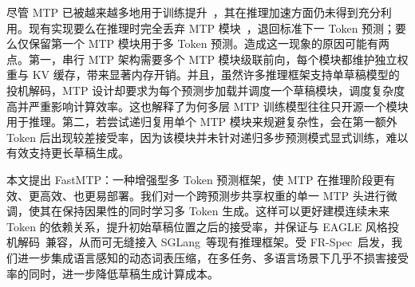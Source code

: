 \documentclass{article} %
\begin{document}



尽管 MTP 已被越来越多地用于训练提升~\citep{qwenteam2025qwen3next80ba3binstruct,glm-4.5team2025glm45,meituanlongcatteam2025longcatflash,xiaomi2025mimo}，其在推理加速方面仍未得到充分利用。现有实现要么在推理时完全丢弃 MTP 模块~\citep{deepseek-ai2024deepseekv3}，退回标准下一 Token 预测；要么仅保留第一个 MTP 模块用于多 Token 预测。造成这一现象的原因可能有两点。第一，串行 MTP 架构需要多个 MTP 模块级联前向，每个模块都维护独立权重与 KV 缓存，带来显著内存开销。并且，虽然许多推理框架支持单草稿模型的投机解码，MTP 设计却要求为每个预测步加载并调度一个草稿模块，调度复杂度高并严重影响计算效率。这也解释了为何多层 MTP 训练模型往往只开源一个模块用于推理。第二，若尝试递归复用单个 MTP 模块来规避复杂性，会在第一额外 Token 后出现较差接受率，因为该模块并未针对递归多步预测模式显式训练，难以有效支持更长草稿生成。

本文提出 FastMTP：一种增强型多 Token 预测框架，使 MTP 在推理阶段更有效、更高效、也更易部署。我们对一个跨预测步共享权重的单一 MTP 头进行微调，使其在保持因果性的同时学习多 Token 生成。这样可以更好建模连续未来 Token 的依赖关系，提升初始草稿位置之后的接受率，并保证与 EAGLE 风格投机解码~\citep{li2024eagle}兼容，从而可无缝接入 SGLang~\citep{zheng2024sglang}等现有推理框架。受 FR-Spec~\citep{zhao2025frspec}启发，我们进一步集成语言感知的动态词表压缩，在多任务、多语言场景下几乎不损害接受率的同时，进一步降低草稿生成计算成本。
\end{document}
